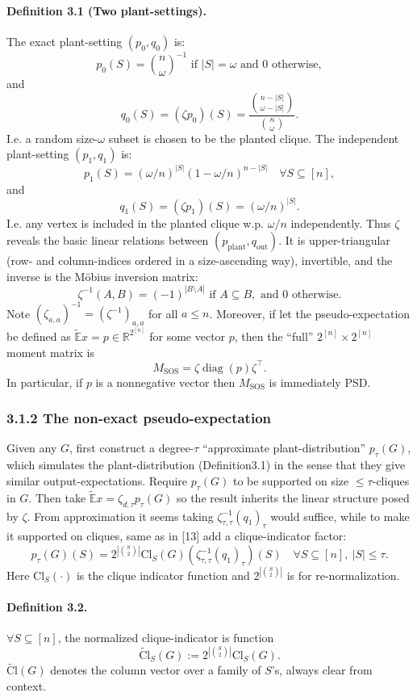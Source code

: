 \paragraph{Definition 3.1 (Two plant-settings).} The exact plant-setting $(p_0,q_0)$ is:
\[p_0(S)=\binom n\omega^{-1}\text{ if }|S|=\omega\text{ and }0\text{ otherwise},\tag{3.3}\]
and
\[q_0(S)=(\zeta p_0)(S)=\frac{\binom{n-|S|}{\omega-|S|}}{\binom n\omega}.\tag{3.4}\]
I.e. a random size-$\omega$ subset is chosen to be the planted clique. The independent plant-setting $(p_1,q_1)$ is:
\[p_1(S)=(\omega/n)^{|S|}(1-\omega/n)^{n-|S|}\quad\forall S\subseteq[n],\tag{3.5}\]
and
\[q_1(S)=(\zeta p_1)(S)=(\omega/n)^{|S|}.\tag{3.6}\]
I.e. any vertex is included in the planted clique w.p. $\omega/n$ independently.
Thus $\zeta$ reveals the basic linear relations between $(p_{\mathrm{plant}},q_{\mathrm{out}})$. It is upper-triangular (row- and column-indices ordered in a size-ascending way), invertible, and the inverse is the M\"obius inversion matrix:
\[\zeta^{-1}(A,B)=(-1)^{|B\setminus A|}\text{ if }A\subseteq B,\text{ and }0\text{ otherwise}.\]
Note $(\zeta_{a,a})^{-1}=(\zeta^{-1})_{a,a}$ for all $a\le n$. Moreover, if let the pseudo-expectation be defined as $\widetilde{\mathbb E}x=p\in\mathbb R^{2^{[n]}}$ for some vector $p$, then the ``full'' $2^{[n]}\times2^{[n]}$ moment matrix is
\[M_{\mathrm{SOS}}=\zeta\operatorname{diag}(p)\zeta^\top.\tag{3.7}\]
In particular, if $p$ is a nonnegative vector then $M_{\mathrm{SOS}}$ is immediately PSD.
\subsubsection*{3.1.2 The non-exact pseudo-expectation}
Given any $G$, first construct a degree-$\tau$ ``approximate plant-distribution'' $p_\tau(G)$, which simulates the plant-distribution (Definition3.1) in the sense that they give similar output-expectations. Require $p_\tau(G)$ to be supported on size $\le\tau$-cliques in $G$. Then take $\widetilde{\mathbb E}x=\zeta_{d,\tau}p_\tau(G)$ so the result inherits the linear structure posed by $\zeta$. From approximation it seems taking $\zeta_{\tau,\tau}^{-1}(q_1)_\tau$ would suffice, while to make it supported on cliques, same as in [13] add a clique-indicator factor:
\[p_\tau(G)(S)=2^{|\binom S2|}\mathrm{Cl}_S(G)\left(\zeta_{\tau,\tau}^{-1}(q_1)_\tau\right)(S)\quad\forall S\subseteq[n],\ |S|\le\tau.\tag{3.8}\]
Here $\mathrm{Cl}_S(\cdot)$ is the clique indicator function and $2^{|\binom S2|}$ is for re-normalization.
\paragraph{Definition 3.2.} $\forall S\subseteq[n]$, the normalized clique-indicator is function \[\widetilde{\mathrm{Cl}}_S(G):=2^{|\binom S2|}\mathrm{Cl}_S(G).\tag{3.9}\]
$\widetilde{\mathrm{Cl}}(G)$ denotes the column vector over a family of $S$'s, always clear from context.
